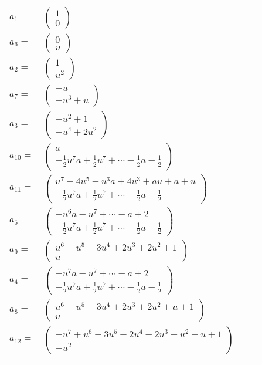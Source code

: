 \documentclass[1p]{elsarticle_modified}
\theoremstyle{definition}
\begin{document}
\begin{tabular}{m{7pt} m{180pt} m{7pt} m{180pt} }
\flushright $a_{1}=$&$\begin{pmatrix}1\\0\end{pmatrix}$ \\
\flushright $a_{6}=$&$\begin{pmatrix}0\\u\end{pmatrix}$ \\
\flushright $a_{2}=$&$\begin{pmatrix}1\\u^2\end{pmatrix}$ \\
\flushright $a_{7}=$&$\begin{pmatrix}- u\\- u^3+u\end{pmatrix}$ \\
\flushright $a_{3}=$&$\begin{pmatrix}- u^2+1\\- u^4+2 u^2\end{pmatrix}$ \\
\flushright $a_{10}=$&$\begin{pmatrix}a\\-\frac{1}{2} u^7 a+\frac{1}{2} u^7+\cdots-\frac{1}{2} a-\frac{1}{2}\end{pmatrix}$ \\
\flushright $a_{11}=$&$\begin{pmatrix}u^7-4 u^5- u^3 a+4 u^3+a u+a+u\\-\frac{1}{2} u^7 a+\frac{1}{2} u^7+\cdots-\frac{1}{2} a-\frac{1}{2}\end{pmatrix}$ \\
\flushright $a_{5}=$&$\begin{pmatrix}- u^6 a- u^7+\cdots- a+2\\-\frac{1}{2} u^7 a+\frac{1}{2} u^7+\cdots-\frac{1}{2} a-\frac{1}{2}\end{pmatrix}$ \\
\flushright $a_{9}=$&$\begin{pmatrix}u^6- u^5-3 u^4+2 u^3+2 u^2+1\\u\end{pmatrix}$ \\
\flushright $a_{4}=$&$\begin{pmatrix}- u^7 a- u^7+\cdots- a+2\\-\frac{1}{2} u^7 a+\frac{1}{2} u^7+\cdots-\frac{1}{2} a-\frac{1}{2}\end{pmatrix}$ \\
\flushright $a_{8}=$&$\begin{pmatrix}u^6- u^5-3 u^4+2 u^3+2 u^2+u+1\\u\end{pmatrix}$ \\
\flushright $a_{12}=$&$\begin{pmatrix}- u^7+u^6+3 u^5-2 u^4-2 u^3- u^2- u+1\\- u^2\end{pmatrix}$\\&\end{tabular}
\end{document}
